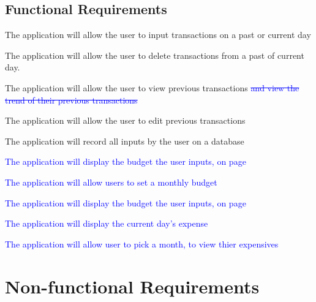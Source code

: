 \documentclass[12pt, titlepage]{article}
\newcounter{funreq}
\newcommand{\frthefunreq}{FR\thefunreq}
\begin{document}
\subsection{Functional Requirements}
   \begin{enumerate}
     \item [\refstepcounter{funreq} \frthefunreq:] The application will allow the user to input transactions on a past or current day
	\item [\refstepcounter{funreq} \frthefunreq:]  The application will allow the user to delete transactions from a past of current day.
     \item  [\refstepcounter{funreq} \frthefunreq:]  The application will allow the user to view previous transactions \textcolor{blue}{\st{ and view the trend of their previous transactions}}
     \item  [\refstepcounter{funreq} \frthefunreq:]  The application will allow the user to edit previous transactions
     \item[\refstepcounter{funreq} \frthefunreq:]  The application will record all inputs by the user on a database
    \textcolor{blue}{ 
\item [\refstepcounter{funreq} \frthefunreq:]  The application will display the budget the user inputs, on page
	\item [\refstepcounter{funreq} \frthefunreq:]  The application will allow users to set a monthly budget
\item [\refstepcounter{funreq} \frthefunreq:]  The application will display the budget the user inputs, on page
\item [\refstepcounter{funreq} \frthefunreq:]  The application will display the current day's expense
\item [\refstepcounter{funreq} \frthefunreq:]  The application will allow user to pick a month, to view thier expensives}
   \end{enumerate}

\section{Non-functional Requirements}
\end{document}
